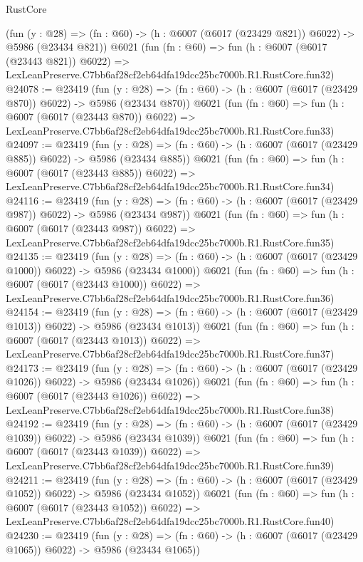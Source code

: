 \begin{lexlean}{RustCore}
\begin{coremodule}
    (fun (y : @28) => (fn : @60) -> (h : @6007 (@6017 (@23429 @821)) @6022) -> @5986 (@23434 @821))
    @6021
    (fun (fn : @60) =>
    fun (h : @6007 (@6017 (@23443 @821)) @6022) =>
    LexLeanPreserve.C7bb6af28cf2eb64dfa19dcc25bc7000b.R1.RustCore.fun32)
@24078 := @23419
    (fun (y : @28) => (fn : @60) -> (h : @6007 (@6017 (@23429 @870)) @6022) -> @5986 (@23434 @870))
    @6021
    (fun (fn : @60) =>
    fun (h : @6007 (@6017 (@23443 @870)) @6022) =>
    LexLeanPreserve.C7bb6af28cf2eb64dfa19dcc25bc7000b.R1.RustCore.fun33)
@24097 := @23419
    (fun (y : @28) => (fn : @60) -> (h : @6007 (@6017 (@23429 @885)) @6022) -> @5986 (@23434 @885))
    @6021
    (fun (fn : @60) =>
    fun (h : @6007 (@6017 (@23443 @885)) @6022) =>
    LexLeanPreserve.C7bb6af28cf2eb64dfa19dcc25bc7000b.R1.RustCore.fun34)
@24116 := @23419
    (fun (y : @28) => (fn : @60) -> (h : @6007 (@6017 (@23429 @987)) @6022) -> @5986 (@23434 @987))
    @6021
    (fun (fn : @60) =>
    fun (h : @6007 (@6017 (@23443 @987)) @6022) =>
    LexLeanPreserve.C7bb6af28cf2eb64dfa19dcc25bc7000b.R1.RustCore.fun35)
@24135 := @23419
    (fun (y : @28) =>
    (fn : @60) -> (h : @6007 (@6017 (@23429 @1000)) @6022) -> @5986 (@23434 @1000))
    @6021
    (fun (fn : @60) =>
    fun (h : @6007 (@6017 (@23443 @1000)) @6022) =>
    LexLeanPreserve.C7bb6af28cf2eb64dfa19dcc25bc7000b.R1.RustCore.fun36)
@24154 := @23419
    (fun (y : @28) =>
    (fn : @60) -> (h : @6007 (@6017 (@23429 @1013)) @6022) -> @5986 (@23434 @1013))
    @6021
    (fun (fn : @60) =>
    fun (h : @6007 (@6017 (@23443 @1013)) @6022) =>
    LexLeanPreserve.C7bb6af28cf2eb64dfa19dcc25bc7000b.R1.RustCore.fun37)
@24173 := @23419
    (fun (y : @28) =>
    (fn : @60) -> (h : @6007 (@6017 (@23429 @1026)) @6022) -> @5986 (@23434 @1026))
    @6021
    (fun (fn : @60) =>
    fun (h : @6007 (@6017 (@23443 @1026)) @6022) =>
    LexLeanPreserve.C7bb6af28cf2eb64dfa19dcc25bc7000b.R1.RustCore.fun38)
@24192 := @23419
    (fun (y : @28) =>
    (fn : @60) -> (h : @6007 (@6017 (@23429 @1039)) @6022) -> @5986 (@23434 @1039))
    @6021
    (fun (fn : @60) =>
    fun (h : @6007 (@6017 (@23443 @1039)) @6022) =>
    LexLeanPreserve.C7bb6af28cf2eb64dfa19dcc25bc7000b.R1.RustCore.fun39)
@24211 := @23419
    (fun (y : @28) =>
    (fn : @60) -> (h : @6007 (@6017 (@23429 @1052)) @6022) -> @5986 (@23434 @1052))
    @6021
    (fun (fn : @60) =>
    fun (h : @6007 (@6017 (@23443 @1052)) @6022) =>
    LexLeanPreserve.C7bb6af28cf2eb64dfa19dcc25bc7000b.R1.RustCore.fun40)
@24230 := @23419
    (fun (y : @28) =>
    (fn : @60) -> (h : @6007 (@6017 (@23429 @1065)) @6022) -> @5986 (@23434 @1065))

\end{coremodule}
\end{lexlean}
